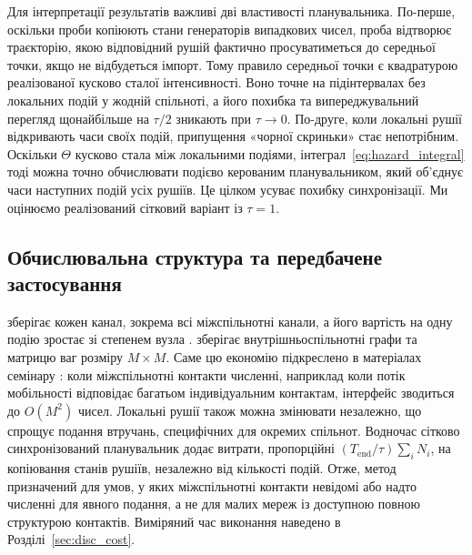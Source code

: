 Для інтерпретації результатів важливі дві властивості планувальника. По-перше, оскільки проби копіюють стани генераторів випадкових чисел, проба відтворює траєкторію, якою відповідний рушій фактично просуватиметься до середньої точки, якщо не відбудеться імпорт. Тому правило середньої точки є квадратурою реалізованої кусково сталої інтенсивності. Воно точне на підінтервалах без локальних подій у жодній спільноті, а його похибка та випереджувальний перегляд щонайбільше на $\tau/2$ зникають при $\tau\to0$. По-друге, коли локальні рушії відкривають часи своїх подій, припущення «чорної скриньки» стає непотрібним. Оскільки $\Theta$ кусково стала між локальними подіями, інтеграл~\eqref{eq:hazard_integral} тоді можна точно обчислювати подієво керованим планувальником, який об'єднує часи наступних подій усіх рушіїв. Це цілком усуває похибку синхронізації. Ми оцінюємо реалізований сітковий варіант із $\tau=1$.

\subsection{Обчислювальна структура та передбачене застосування}
\label{sec:cost}

\Full{} зберігає кожен канал, зокрема всі міжспільнотні канали, а його вартість на одну подію зростає зі степенем вузла \citep{kuryliak2025simulating}. \TS{} зберігає внутрішньоспільнотні графи та матрицю ваг розміру $M\times M$. Саме цю економію підкреслено в матеріалах семінару \citep{kuryliak2025towards}: коли міжспільнотні контакти численні, наприклад коли потік мобільності відповідає багатьом індивідуальним контактам, інтерфейс зводиться до $O(M^2)$ чисел. Локальні рушії також можна змінювати незалежно, що спрощує подання втручань, специфічних для окремих спільнот. Водночас сітково синхронізований планувальник додає витрати, пропорційні $(T_{\mathrm{end}}/\tau)\sum_iN_i$, на копіювання станів рушіїв, незалежно від кількості подій. Отже, метод призначений для умов, у яких міжспільнотні контакти невідомі або надто численні для явного подання, а не для малих мереж із доступною повною структурою контактів. Виміряний час виконання наведено в Розділі~\ref{sec:disc_cost}.


